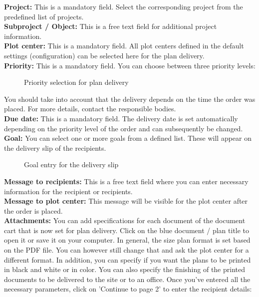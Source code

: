 \textbf{Project:} This is a mandatory field. Select the corresponding project from the predefined list of projects. \\
\textbf{Subproject / Object:} This is a free text field for additional project information. \\
\textbf{Plot center:} This is a mandatory field. All plot centers defined in the default settings (configuration) can be selected here for the plan delivery. \\
\textbf{Priority:} This is a mandatory field. You can choose between three priority levels:
\begin{figure}[H]
\caption{Priority selection for plan delivery}
\end{figure}
You should take into account that the delivery depends on the time the order was placed. For more details, contact the responsible bodies. \\
\textbf{Due date:} This is a mandatory field. The delivery date is set automatically depending on the priority level of the order and can subsequently be changed. \\
\textbf{Goal:} You can select one or more goals from a defined list. These will appear on the delivery slip of the recipients.
\begin{figure}[H]
\caption{Goal entry for the delivery slip}
\end{figure}
\textbf{Message to recipients:} This is a free text field where you can enter necessary information for the recipient or recipients. \\
\textbf{Message to plot center:} This message will be visible for the plot center after the order is placed. \\
\textbf{Attachments:} You can add specifications for each document of the document cart that is now set for plan delivery. Click on the blue document / plan title to open it or save it on your computer.
In general, the size plan format is set based on the PDF file. You can however still change that and ask the plot center for a different format. In addition, you can specify if you want the plans to be printed in black and white or in color. You can also specify the finishing of the printed documents to be delivered to the site or to an office.
Once you've entered all the necessary parameters, click on 'Continue to page 2' to enter the recipient details:


